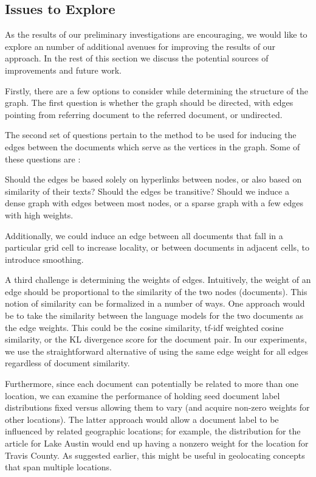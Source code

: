 \subsection{Issues to Explore}  

As the results of our preliminary investigations are encouraging, we would like to explore an number of additional avenues
for improving the results of our approach. In the rest of this section we discuss the potential sources of improvements and future work.

\par Firstly, there are a few options to consider while determining the structure of the
graph. The first question is whether the graph should be directed, with edges
pointing from referring document to the referred document, or undirected. 

\par The second set of questions pertain to the method to be used for inducing
the edges between the documents which serve as the vertices in the graph. Some of these questions are :

\begin{enumerate}
\list Should the edges be based solely on hyperlinks between nodes, or also based on similarity of their texts?
\list Should the edges be transitive?
\list Should we induce a dense graph with edges between most nodes, or a sparse graph with a few edges with high weights. 
\end{enumerate}

Additionally, we could induce an edge between
all documents that fall in a particular grid cell to increase locality, or
between documents in adjacent cells, to introduce smoothing.

\par A third challenge is determining the weights of edges. Intuitively, the
weight of an edge should be proportional to the similarity of the two nodes
(documents). This notion of similarity can be formalized in a number of ways.
One approach would be to take the similarity between the language models for
the two documents as the edge weights. This could be the cosine similarity,
tf-idf weighted cosine similarity, or the KL divergence score for the document pair. 
In our experiments, we use the straightforward alternative of using the 
same edge weight for all edges regardless of document similarity.

 
\par Furthermore, since each document can potentially be related to more than
one location, we can examine the performance of holding seed document label
distributions fixed versus allowing them to vary (and acquire non-zero weights
for other locations). The latter approach would allow a document label to be
influenced by related geographic locations;  for example, the distribution for
the article for Lake Austin would end up having a nonzero weight for the
location for Travis County. As suggested earlier, this might be useful in
geolocating concepts that span multiple locations.


